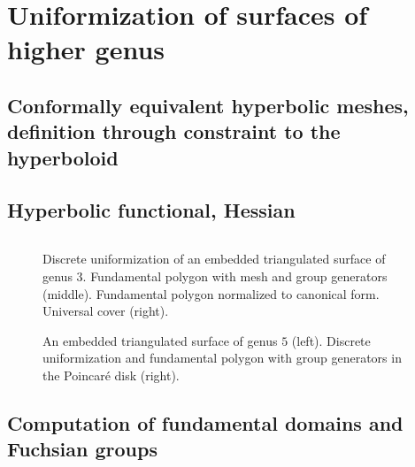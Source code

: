 \documentclass[Thesis.tex]{subfiles}
\begin{document}
  \section{Uniformization of surfaces of higher genus}

  \subsection{Conformally equivalent hyperbolic meshes, definition through constraint to the hyperboloid}
  \subsection{Hyperbolic functional, Hessian}

  \begin{equation}
    \label{eq:hyperbolic_fuctional}
  \end{equation}

  \begin{figure}
      \centering
      \caption{Discrete uniformization of an embedded triangulated surface of genus $3$. Fundamental polygon with mesh and group generators (middle). Fundamental polygon normalized to canonical form. Universal cover (right).}
      \label{fig:embedded_genus_3}
  \end{figure}

  \begin{figure}
      \centering
      \caption{An embedded triangulated surface of genus $5$ (left). Discrete uniformization and fundamental polygon with  group generators in the Poincar\'e disk (right).}
      \label{fig:embedded_genus_5}
  \end{figure}





  \subsection{Computation of fundamental domains and Fuchsian groups}
  \label{sec:fundamental_domains}
\end{document}
